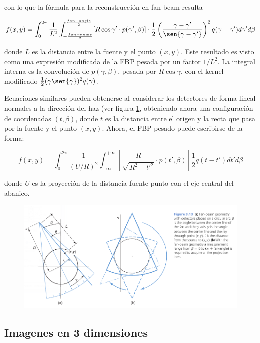 \noindent
con lo que la fórmula para la reconstrucción en fan-beam resulta \cite{fundamentals2009}

\begin{equation}
 f(x,y) = \int_{0}^{2\pi} \frac{1}{L^{2}}\int_{-\frac{fan-angle}{2}}^{\frac{fan-angle}{2}}[R \cos{\gamma' \cdot p(\gamma', \beta)}] \cdot \frac{1}{2}\left(\frac{\gamma - \gamma'}{\sen{\gamma - \gamma'}}\right)^{2} q(\gamma - \gamma')d\gamma'd\beta
\end{equation}

\noindent
donde $L$ es la distancia entre la fuente y el punto $(x,y)$. Este resultado es visto como una expresión modificada de la FBP pesada por un factor $1/L^{2}$. La integral interna es la convolución de $p(\gamma, \beta)$, pesada por $R\cos{\gamma}$, con el kernel modificado $\frac{1}{2}(\gamma \sen{\gamma})^{2}q(\gamma)$.

Ecuaciones similares pueden obtenerse al considerar los detectores de forma lineal normales a la dirección del haz (ver figura \ref{fig:10-3}, obteniendo ahora una configuración de coordenadas $(t, \beta)$, donde $t$ es la distancia entre el origen y la recta que pasa por la fuente y el punto $(x, y)$. Ahora, el FBP pesado puede escribirse de la forma:

\begin{equation}
 f(x, y) = \int_{0}^{2\pi} \frac{1}{(U/R)^{2}}\int_{-\infty}^{+\infty}\left[\frac{R}{\sqrt{R^{2} + t'^{2}}}\cdot p(t', \beta)\right]\frac{1}{2}q(t-t')dt'd\beta
\end{equation}

\noindent
donde $U$ es la proyección de la distancia fuente-punto con el eje central del abanico.

\begin{figure}
 \centering
 \includegraphics[width=.75\textwidth]{Figuras/cap10-2.png}
 \caption{}
 \label{fig:10-3}
\end{figure}

\subsection{Imagenes en 3 dimensiones}

